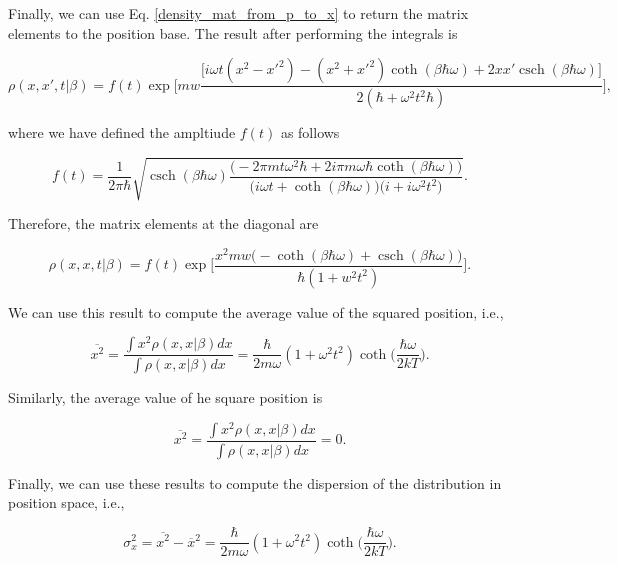 \documentclass{article}
\DeclareMathOperator{\csch}{csch}
\begin{document}
Finally, we can use Eq. \ref{density_mat_from_p_to_x} to return the matrix elements to the position base. The result after performing the integrals is

\begin{equation}
    \rho(x, x', t|\beta) = f(t) \exp \Bigg[ mw \frac{\big[ i\omega t(x^{2}-x'^{2})-(x^{2}+x'^{2})\coth(\beta \hbar \omega) + 2xx' \csch(\beta \hbar \omega) \big]}{2(\hbar + \omega^{2}t^{2}\hbar)} \Bigg],
\end{equation}

where we have defined the ampltiude $f(t)$ as follows

\begin{equation}
    f(t)=\frac{1}{2\pi \hbar} \sqrt{ \csch(\beta \hbar \omega) \frac{\big(-2\pi m t \omega^{2} \hbar + 2i\pi m \omega \hbar \coth(\beta \hbar \omega)\big)}{\big( i\omega t + \coth(\beta \hbar \omega) \big) \big( i + i\omega^{2} t^{2} \big)}}.
\end{equation}

Therefore, the matrix elements at the diagonal are

\begin{equation}
    \rho(x, x, t|\beta) = f(t) \exp \bigg[\frac{x^{2}mw \big( -\coth(\beta \hbar \omega) + \csch(\beta \hbar \omega) \big)}{\hbar (1+w^{2}t^{2})} \bigg].
\end{equation}

We can use this result to compute the average value of the squared position, i.e.,

\begin{equation}
    \overline{x^{2}} = \frac{\int x^{2} \rho(x,x|\beta) dx}{\int \rho(x,x|\beta) dx} =  \frac{\hbar}{2m\omega}(1+\omega^{2}t^{2})\coth \bigg( \frac{\hbar \omega}{2 k T} \bigg).
\end{equation}

Similarly, the average value of he square position is

\begin{equation}
    \overline{x^{2}} = \frac{\int x^{2} \rho(x,x|\beta) dx}{\int \rho(x,x|\beta) dx} =  0.
\end{equation}

Finally, we can use these results to compute the dispersion of the distribution in position space, i.e.,

\begin{equation}\label{atomic_dispersion_no_gravity}
    \sigma_{x}^{2} = \overline{x^{2}} - \overline{x}^{2} = \frac{\hbar}{2m\omega}(1+\omega^{2}t^{2})\coth\bigg( \frac{\hbar \omega}{2kT} \bigg).
\end{equation}
\end{document}
